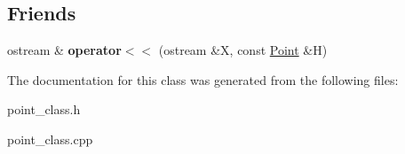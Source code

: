 \subsection*{Friends}
\begin{DoxyCompactItemize}
\item 
\mbox{\label{classPoint_af113210dbdf59ad1a6621e2e30e14aea}} 
ostream \& {\bfseries operator$<$$<$} (ostream \&X, const \hyperlink{classPoint}{Point} \&H)
\end{DoxyCompactItemize}


The documentation for this class was generated from the following files\+:\begin{DoxyCompactItemize}
\item 
point\+\_\+class.\+h\item 
point\+\_\+class.\+cpp\end{DoxyCompactItemize}
